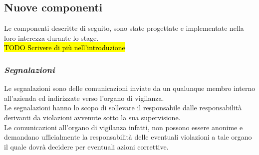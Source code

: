 \subsection{Nuove componenti}
Le componenti descritte di seguito, sono state progettate e implementate nella loro interezza durante lo stage.\\
\hl{TODO Scrivere di più nell'introduzione}

\subsubsection{\textit{Segnalazioni}}
Le segnalazioni sono delle comunicazioni inviate da un qualunque membro interno all'azienda ed indirizzate verso l'organo di vigilanza.\\
Le segnalazioni hanno lo scopo di sollevare il responsabile dalle responsabilità derivanti da violazioni avvenute sotto la sua supervisione. \\
Le comunicazioni all'organo di vigilanza infatti, non possono essere anonime e demandano ufficialmente la responsabilità delle eventuali violazioni a tale organo il quale dovrà decidere per eventuali azioni correttive.
	
